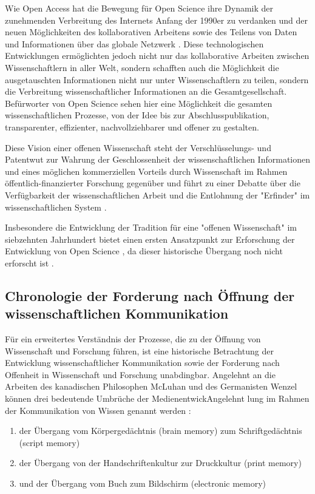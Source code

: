 Wie Open Access hat die Bewegung für Open Science ihre Dynamik der zunehmenden Verbreitung des Internets Anfang der 1990er zu verdanken \cite{Lievrouw_2010} und der neuen Möglichkeiten des kollaborativen Arbeitens sowie des Teilens von Daten und Informationen über das globale Netzwerk \cite{Meyer_2013}. Diese technologischen Entwicklungen ermöglichten jedoch nicht nur das kollaborative Arbeiten zwischen Wissenschaftlern in aller Welt, sondern schafften auch die Möglichkeit die ausgetauschten Informationen nicht nur unter Wissenschaftlern zu teilen, sondern die Verbreitung wissenschaftlicher Informationen an die Gesamtgesellschaft. Befürworter von Open Science sehen hier eine Möglichkeit die gesamten wissenschaftlichen Prozesse, von der Idee bis zur Abschlusspublikation, transparenter, effizienter, nachvollziehbarer und offener zu gestalten.

Diese Vision einer offenen Wissenschaft steht der Verschlüsselungs- und Patentwut zur Wahrung der Geschlossenheit der wissenschaftlichen Informationen und eines möglichen kommerziellen Vorteils durch Wissenschaft im Rahmen öffentlich-finanzierter Forschung gegenüber und führt zu einer Debatte über die Verfügbarkeit der wissenschaftlichen Arbeit und die Entlohnung der "Erfinder" im wissenschaftlichen System \cite{suchen}.

Insbesondere die Entwicklung der Tradition für eine "offenen Wissenschaft" im siebzehnten Jahrhundert bietet einen ersten Ansatzpunkt zur Erforschung der Entwicklung von Open Science \cite{Scheliga_2014}, da dieser historische Übergang noch nicht erforscht ist \cite{CREATe_2014}.

\subsection{Chronologie der Forderung nach Öffnung der wissenschaftlichen Kommunikation}
Für ein erweitertes Verständnis der Prozesse, die zu der Öffnung von Wissenschaft und Forschung führen, ist eine historische Betrachtung der Entwicklung wissenschaftlicher Kommunikation sowie der Forderung nach Offenheit in Wissenschaft und Forschung unabdingbar. Angelehnt an die Arbeiten des kanadischen Philosophen McLuhan und des Germanisten Wenzel können drei bedeutende Umbrüche der MedienentwickAngelehnt lung im Rahmen der Kommunikation von Wissen \cite{wunderlich_2008_buchdruck} genannt werden  \cite{wenzel_mediengeschichte_2007}:
\begin{enumerate}
\item der Übergang vom Körpergedächtnis (brain memory) zum Schriftgedächtnis (script memory)
\item der Übergang von der Handschriftenkultur zur Druckkultur (print memory)
\item und der Übergang vom Buch zum Bildschirm (electronic memory)
\end{enumerate}

